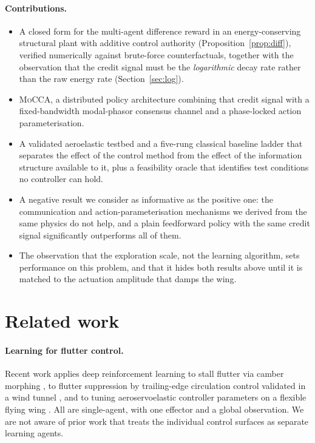 \documentclass[11pt,a4paper]{article}
\begin{document}
\paragraph{Contributions.}
\begin{itemize}
\item A closed form for the multi-agent difference reward in an
energy-conserving structural plant with additive control authority
(Proposition~\ref{prop:diff}), verified numerically against brute-force
counterfactuals, together with the observation that the credit signal must be the
\emph{logarithmic} decay rate rather than the raw energy rate
(Section~\ref{sec:log}).
\item \textsc{MoCCA}, a distributed policy architecture combining that credit
signal with a fixed-bandwidth modal-phasor consensus channel and a phase-locked
action parameterisation.
\item A validated aeroelastic testbed and a five-rung classical baseline ladder
that separates the effect of the control method from the effect of the
information structure available to it, plus a feasibility oracle that identifies
test conditions no controller can hold.
\item A negative result we consider as informative as the positive one: the
communication and action-parameterisation mechanisms we derived from the same
physics do not help, and a plain feedforward policy with the same credit signal
significantly outperforms all of them.
\item The observation that the exploration scale, not the learning algorithm,
sets performance on this problem, and that it hides both results above until it
is matched to the actuation amplitude that damps the wing.
\end{itemize}

\section{Related work}

\paragraph{Learning for flutter control.}
Recent work applies deep reinforcement learning to stall flutter via camber
morphing \cite{stallflutter2025}, to flutter suppression by trailing-edge
circulation control validated in a wind tunnel \cite{circulation2023}, and to
tuning aeroservoelastic controller parameters on a flexible flying wing
\cite{flyingwing2022}. All are single-agent, with one effector and a global
observation. We are not aware of prior work that treats the individual control
surfaces as separate learning agents.
\end{document}
